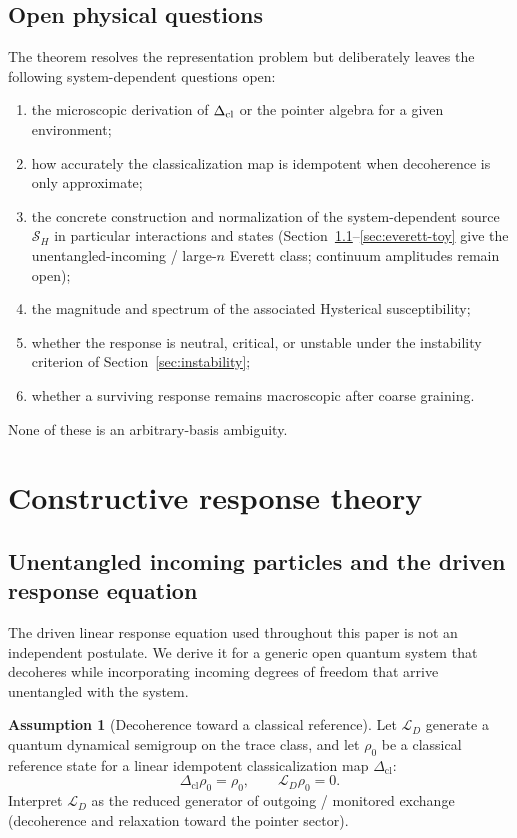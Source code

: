 \documentclass[11pt]{article}
\theoremstyle{definition}
\newtheorem{assumption}[theorem]{Assumption}
\theoremstyle{remark}
\begin{document}
\subsection{Open physical questions}
The theorem resolves the representation problem but deliberately leaves the following system-dependent questions open:
\begin{enumerate}
\item the microscopic derivation of $\Delta_{\rm cl}$ or the pointer algebra for a given environment;
\item how accurately the classicalization map is idempotent when decoherence is only approximate;
\item the concrete construction and normalization of the system-dependent source $\mathcal S_H$ in particular interactions and states (Section~\ref{sec:incoming-drive}--\ref{sec:everett-toy} give the unentangled-incoming / large-$n$ Everett class; continuum amplitudes remain open);

\item the magnitude and spectrum of the associated Hysterical susceptibility;
\item whether the response is neutral, critical, or unstable under the instability criterion of Section~\ref{sec:instability};
\item whether a surviving response remains macroscopic after coarse graining.
\end{enumerate}
None of these is an arbitrary-basis ambiguity.

\section{Constructive response theory}
\label{sec:constructive}

\subsection{Unentangled incoming particles and the driven response equation}
\label{sec:incoming-drive}
The driven linear response equation used throughout this paper is not an independent postulate.
We derive it for a generic open quantum system that decoheres while incorporating incoming degrees of freedom that arrive unentangled with the system.

\begin{assumption}[Decoherence toward a classical reference]
\label{ass:decoherence-ref}
Let $\mathcal L_D$ generate a quantum dynamical semigroup on the trace class, and let $\rho_0$ be a classical reference state for a linear idempotent classicalization map $\Delta_{\mathrm{cl}}$:
\begin{equation}
  \Delta_{\mathrm{cl}}\rho_0=\rho_0,\qquad \mathcal L_D\rho_0=0.
\end{equation}
Interpret $\mathcal L_D$ as the reduced generator of outgoing / monitored exchange (decoherence and relaxation toward the pointer sector).
\end{assumption}
\end{document}
